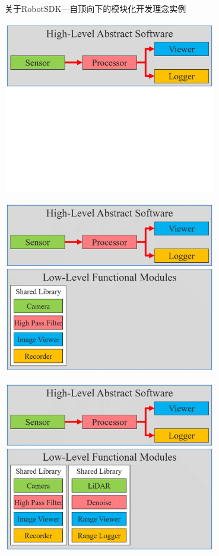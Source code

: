 \documentclass[9pt]{beamer}
\begin{document}
	\begin{frame}[allowframebreaks]{关于RobotSDK---自顶向下的模块化开发理念实例}
		\begin{center}
			\includegraphics[width=0.7\textwidth]{./img/ex1-1}
		\end{center}
		\begin{center}
			\includegraphics[width=0.7\textwidth]{./img/ex1-2}
		\end{center}
		\begin{center}
			\includegraphics[width=0.7\textwidth]{./img/ex1-3}

\end{center}
\end{frame}
\end{document}

